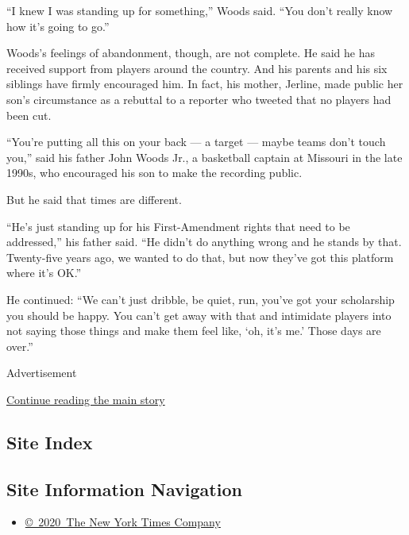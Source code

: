 ``I knew I was standing up for something,'' Woods said. ``You don't
really know how it's going to go.''

Woods's feelings of abandonment, though, are not complete. He said he
has received support from players around the country. And his parents
and his six siblings have firmly encouraged him. In fact, his mother,
Jerline, made public her son's circumstance as a rebuttal to a reporter
who tweeted that no players had been cut.

``You're putting all this on your back --- a target --- maybe teams
don't touch you,'' said his father John Woods Jr., a basketball captain
at Missouri in the late 1990s, who encouraged his son to make the
recording public.

But he said that times are different.

``He's just standing up for his First-Amendment rights that need to be
addressed,'' his father said. ``He didn't do anything wrong and he
stands by that. Twenty-five years ago, we wanted to do that, but now
they've got this platform where it's OK.''

He continued: ``We can't just dribble, be quiet, run, you've got your
scholarship you should be happy. You can't get away with that and
intimidate players into not saying those things and make them feel like,
`oh, it's me.' Those days are over.''

Advertisement

\protect\hyperlink{after-bottom}{Continue reading the main story}

\hypertarget{site-index}{%
\subsection{Site Index}\label{site-index}}

\hypertarget{site-information-navigation}{%
\subsection{Site Information
Navigation}\label{site-information-navigation}}

\begin{itemize}
\tightlist
\item
  \href{https://help.nytimes3xbfgragh.onion/hc/en-us/articles/115014792127-Copyright-notice}{©~2020~The
  New York Times Company}
\end{itemize}

